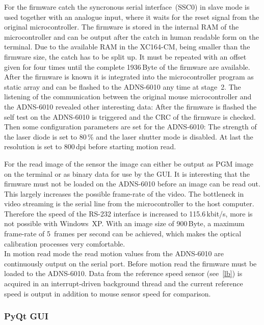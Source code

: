 \documentclass[12pt,a4paper]{article}
\begin{document}
For the firmware catch the syncronous serial interface~(SSC0) in slave mode is used together with an analogue input, where it waits for the reset signal from the original microcontroller.
The firmware is stored in the internal RAM of the microcontroller and can be output after the catch in human readable form on the terminal.
Due to the available RAM in the XC164-CM, being smaller than the firmware size, the catch has to be split up.
It must be repeated with an offset given for four times until the complete 1936\,Byte of the firmware are available.
After the firmware is known it is integrated into the microcontroller program as static array and can be flashed to the ADNS-6010 any time at stage~2.
The listening of the communication between the original mouse microcontroller and the ADNS-6010 revealed other interesting data:
After the firmware is flashed the self test on the ADNS-6010 is triggered and the CRC of the firmware is checked.
Then some configuration parameters are set for the ADNS-6010:
The strength of the laser diode is set to 80\,\% and the laser shutter mode is disabled. 
At last the resolution is set to 800\,dpi before starting motion read.

For the read image of the sensor the image can either be output as PGM image on the terminal or as binary data for use by the GUI.
It is interesting that the firmware must not be loaded on the ADNS-6010 before an image can be read out.
This largely increases the possible frame-rate of the video.
The bottleneck in video streaming is the serial line from the microcontroller to the host computer.
Therefore the speed of the RS-232 interface is increased to 115.6\,kbit/s, more is not possible with Windows~XP.
With an image size of 900\,Byte, a maximum frame-rate of 5~frames per second can be achieved, which makes the optical calibration processes very comfortable.\\
In motion read mode the read motion values from the ADNS-6010 are continuously output on the serial port.
Before motion read the firmware must be loaded to the ADNS-6010.
Data from the reference speed sensor (see~\autoref{lb}) is acquired in an interrupt-driven background thread and the current reference speed is output in addition to mouse sensor speed for comparison.

\subsubsection{PyQt GUI}
\label{sec:pyqtgui}
\end{document}
